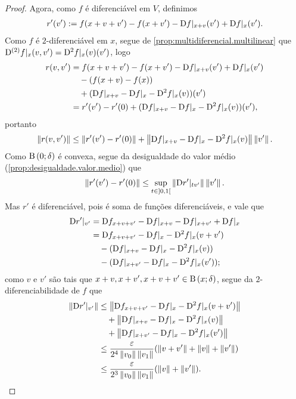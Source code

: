 \begin{proof}
Agora, como $f$ é diferenciável em $V$, definimos
	\begin{align*}
	r'(v') := f(x+v+v') - f(x+v') - \mathrm{D} f|_{x+v}(v') + \mathrm{D} f|_x(v').
	\end{align*}
Como $f$ é $2$-diferenciável em $x$, segue de \ref{prop:multidiferencial.multilinear} que $\mathrm{D}^{(2)} f|_x(v,v') = \mathrm{D}^2 f|_x(v)(v')$, logo
	\begin{align*}
	r(v,v') &= f(x+v+v') - f(x+v') - \mathrm{D} f|_{x+v}(v') + \mathrm{D} f|_x(v') \\
		&\quad - (f(x+v) - f(x)) \\
		&\quad + (\mathrm{D} f|_{x+v} - \mathrm{D} f|_x - \mathrm{D}^2 f|_x(v))(v') \\
		&= r'(v') - r'(0) + (\mathrm{D} f|_{x+v} - \mathrm{D} f|_x - \mathrm{D}^2 f|_x(v))(v'),
	\end{align*}
portanto
	\begin{equation*}
	\left\Vert{r(v,v')}\right\Vert \leq \left\Vert{r'(v') - r'(0)}\right\Vert + \left\Vert{\mathrm{D}f|_{x+v} - \mathrm{D}f|_x - \mathrm{D}^2 f|_x(v)}\right\Vert\left\Vert{v'}\right\Vert.
	\end{equation*}
Como $\mathrm{B}\left(0; \delta\right)$ é convexa, segue da desigualdade do valor médio (\ref{prop:desigualdade.valor.medio}) que
	\begin{equation*}
	\left\Vert{r'(v') - r'(0)}\right\Vert \leq \sup_{t \in \left]0,\allowbreak 1\right[} \left\Vert{\mathrm{D}r'|_{tv'}}\right\Vert \left\Vert{v'}\right\Vert.
	\end{equation*}
Mas $r'$ é diferenciável, pois é soma de funções diferenciáveis, e vale que
	\begin{align*}
	\mathrm{D} r'|_{v'} &= \mathrm{D} f_{x+v+v'} - \mathrm{D} f|_{x+v} - \mathrm{D} f|_{x+v'} + \mathrm{D} f|_x \\
		&= \mathrm{D} f_{x+v+v'} - \mathrm{D} f|_x - \mathrm{D}^2 f|_x (v+v') \\
		&\quad - (\mathrm{D} f|_{x+v} - \mathrm{D} f|_x - \mathrm{D}^2 f|_x (v)) \\
		&\quad - (\mathrm{D} f|_{x+v'} - \mathrm{D} f|_x - \mathrm{D}^2 f|_x (v'));
	\end{align*}
como $v$ e $v'$ são tais que $x+v, x+v', x+v+v' \in \mathrm{B}\left(x; \delta\right)$, segue da $2$-diferenciabilidade de $f$ que
	\begin{align*}
	\left\Vert{\mathrm{D}r'|_{v'}}\right\Vert &\leq \left\Vert{\mathrm{D}f_{x+v+v'} - \mathrm{D}f|_x - \mathrm{D}^2 f|_x (v+v')}\right\Vert \\
		&\quad + \left\Vert{\mathrm{D}f|_{x+v} - \mathrm{D}f|_x - \mathrm{D}^2 f|_x (v)}\right\Vert \\
		&\quad + \left\Vert{\mathrm{D}f|_{x+v'} - \mathrm{D}f|_x - \mathrm{D}^2 f|_x (v')}\right\Vert \\
		&\leq \frac{\varepsilon}{2^4\left\Vert{v_0}\right\Vert\left\Vert{v_1}\right\Vert} (\left\Vert{v+v'}\right\Vert + \left\Vert{v}\right\Vert + \left\Vert{v'}\right\Vert) \\
		&\leq \frac{\varepsilon}{2^3\left\Vert{v_0}\right\Vert\left\Vert{v_1}\right\Vert} (\left\Vert{v}\right\Vert + \left\Vert{v'}\right\Vert).
	\end{align*}

\end{proof}
